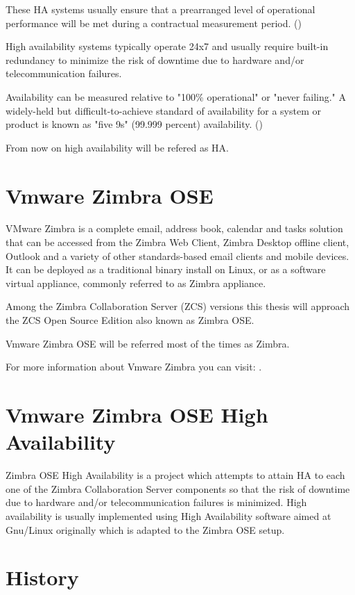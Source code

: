 These HA systems usually ensure that a prearranged level of operational performance will be met during a contractual measurement period. (\cite{WikipediaHA})

High availability systems typically operate 24x7 and usually require built-in redundancy to minimize the risk of downtime due to hardware and/or telecommunication failures. 

Availability can be measured relative to "100\% operational" or "never failing." A widely-held but difficult-to-achieve standard of availability for a system or product is known as "five 9s" (99.999 percent) availability. (\cite{BCMHA})

From now on high availability will be refered as HA.

\section {Vmware Zimbra OSE}
VMware Zimbra is a complete email, address book, calendar and tasks solution that can be accessed from the Zimbra Web Client, Zimbra Desktop offline client, Outlook and a variety of other standards-based email clients and mobile devices. It can be deployed as a traditional binary install on Linux, or as a software virtual appliance, commonly referred to as Zimbra appliance.

Among the Zimbra Collaboration Server (ZCS) versions this thesis will approach the ZCS Open Source Edition also known as Zimbra OSE.

Vmware Zimbra OSE will be referred most of the times as Zimbra.

For more information about Vmware Zimbra you can visit: \cite{ZimbraLearn}.

\section {Vmware Zimbra OSE High Availability}
Zimbra OSE High Availability is a project which attempts to attain HA to each one of the Zimbra Collaboration Server components so that the risk of downtime due to hardware and/or telecommunication failures is minimized. High availability is usually implemented using High Availability software aimed at Gnu/Linux originally which is adapted to the Zimbra OSE setup.


\section{\label{sec:history}History}

